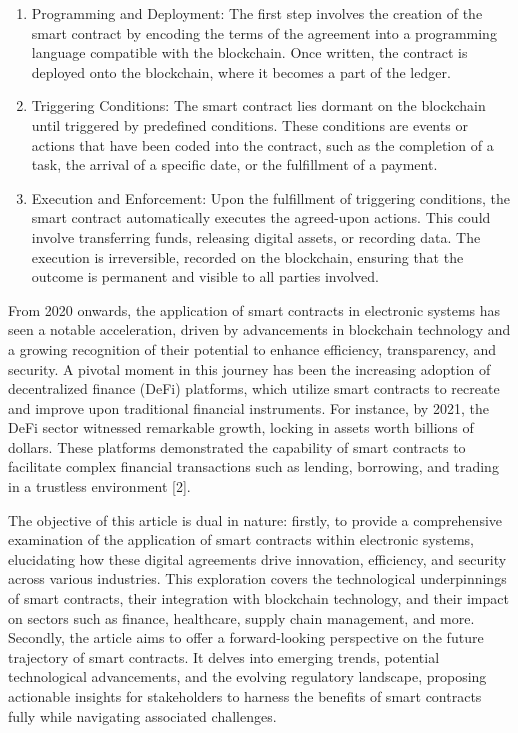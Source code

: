 \begin{enumerate}
\def\labelenumi{\arabic{enumi}.}
\item
  Programming and Deployment: The first step involves the creation of
  the smart contract by encoding the terms of the agreement into a
  programming language compatible with the blockchain. Once written, the
  contract is deployed onto the blockchain, where it becomes a part of
  the ledger.
\item
  Triggering Conditions: The smart contract lies dormant on the
  blockchain until triggered by predefined conditions. These conditions
  are events or actions that have been coded into the contract, such as
  the completion of a task, the arrival of a specific date, or the
  fulfillment of a payment.
\item
  Execution and Enforcement: Upon the fulfillment of triggering
  conditions, the smart contract automatically executes the agreed-upon
  actions. This could involve transferring funds, releasing digital
  assets, or recording data. The execution is irreversible, recorded on
  the blockchain, ensuring that the outcome is permanent and visible to
  all parties involved.
\end{enumerate}

From 2020 onwards, the application of smart contracts in electronic
systems has seen a notable acceleration, driven by advancements in
blockchain technology and a growing recognition of their potential to
enhance efficiency, transparency, and security. A pivotal moment in this
journey has been the increasing adoption of decentralized finance (DeFi)
platforms, which utilize smart contracts to recreate and improve upon
traditional financial instruments. For instance, by 2021, the DeFi
sector witnessed remarkable growth, locking in assets worth billions of
dollars. These platforms demonstrated the capability of smart contracts
to facilitate complex financial transactions such as lending, borrowing,
and trading in a trustless environment {[}2{]}.

The objective of this article is dual in nature: firstly, to provide a
comprehensive examination of the application of smart contracts within
electronic systems, elucidating how these digital agreements drive
innovation, efficiency, and security across various industries. This
exploration covers the technological underpinnings of smart contracts,
their integration with blockchain technology, and their impact on
sectors such as finance, healthcare, supply chain management, and more.
Secondly, the article aims to offer a forward-looking perspective on the
future trajectory of smart contracts. It delves into emerging trends,
potential technological advancements, and the evolving regulatory
landscape, proposing actionable insights for stakeholders to harness the
benefits of smart contracts fully while navigating associated
challenges.

